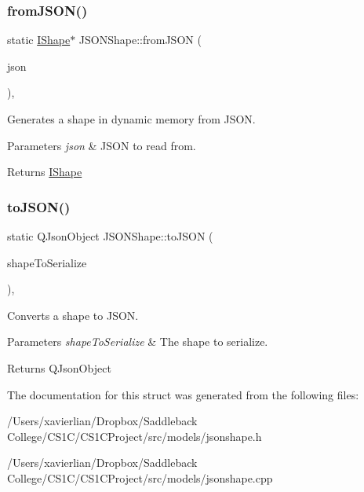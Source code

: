 \subsubsection{\texorpdfstring{fromJSON()}{fromJSON()}}
{\footnotesize\ttfamily static \mbox{\hyperlink{class_i_shape}{I\+Shape}}$\ast$ J\+S\+O\+N\+Shape\+::from\+J\+S\+ON (\begin{DoxyParamCaption}\item[{const Q\+Json\+Object \&}]{json }\end{DoxyParamCaption})\hspace{0.3cm}{\ttfamily [inline]}, {\ttfamily [static]}}



Generates a shape in dynamic memory from J\+S\+ON. 


\begin{DoxyParams}{Parameters}
{\em json} & J\+S\+ON to read from. \\
\hline
\end{DoxyParams}
\begin{DoxyReturn}{Returns}
\mbox{\hyperlink{class_i_shape}{I\+Shape}} 
\end{DoxyReturn}
\mbox{\label{struct_j_s_o_n_shape_a38bb052953becd55f29000f819aa314d}} 
\subsubsection{\texorpdfstring{toJSON()}{toJSON()}}
{\footnotesize\ttfamily static Q\+Json\+Object J\+S\+O\+N\+Shape\+::to\+J\+S\+ON (\begin{DoxyParamCaption}\item[{const \mbox{\hyperlink{class_i_shape}{I\+Shape}} $\ast$}]{shape\+To\+Serialize }\end{DoxyParamCaption})\hspace{0.3cm}{\ttfamily [inline]}, {\ttfamily [static]}}



Converts a shape to J\+S\+ON. 


\begin{DoxyParams}{Parameters}
{\em shape\+To\+Serialize} & The shape to serialize. \\
\hline
\end{DoxyParams}
\begin{DoxyReturn}{Returns}
Q\+Json\+Object 
\end{DoxyReturn}


The documentation for this struct was generated from the following files\+:\begin{DoxyCompactItemize}
\item 
/\+Users/xavierlian/\+Dropbox/\+Saddleback College/\+C\+S1\+C/\+C\+S1\+C\+Project/src/models/jsonshape.\+h\item 
/\+Users/xavierlian/\+Dropbox/\+Saddleback College/\+C\+S1\+C/\+C\+S1\+C\+Project/src/models/jsonshape.\+cpp\end{DoxyCompactItemize}
